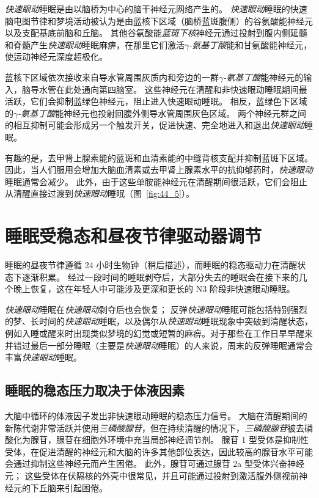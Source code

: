 \textit{快速眼动}睡眠是由以脑桥为中心的脑干神经元网络产生的。
\textit{快速眼动}睡眠的快速脑电图节律和梦境活动被认为是由蓝核下区域（脑桥蓝斑腹侧）的谷氨酸能神经元以及支配基底前脑和丘脑。
其他谷氨酸能\textit{蓝斑下核}神经元通过投射到腹内侧延髓和脊髓产生\textit{快速眼动}睡眠麻痹，在那里它们激活\textit{$\gamma$-氨基丁酸}能和甘氨酸能神经元，使运动神经元深度超极化。


蓝核下区域依次接收来自导水管周围灰质内和旁边的一群\textit{$\gamma$-氨基丁酸}能神经元的输入，脑导水管在此处通向第四脑室。
这些神经元在清醒和非快速眼动睡眠期间最活跃，它们会抑制蓝绿色神经元，阻止进入快速眼动睡眠。
相反，蓝绿色下区域的\textit{$\gamma$-氨基丁酸}能神经元也投射回腹外侧导水管周围灰色区域。
两个神经元群之间的相互抑制可能会形成另一个触发开关，促进快速、完全地进入和退出\textit{快速眼动}睡眠。


有趣的是，去甲肾上腺素能的蓝斑和血清素能的中缝背核支配并抑制蓝斑下区域。
因此，当人们服用会增加大脑血清素或去甲肾上腺素水平的抗抑郁药时，\textit{快速眼动}睡眠通常会减少。
此外，由于这些单胺能神经元在清醒期间很活跃，它们会阻止从清醒直接过渡到\textit{快速眼动}睡眠（图~\ref{fig:44_5}）。



\section{睡眠受稳态和昼夜节律驱动器调节}

睡眠的昼夜节律遵循 24 小时生物钟（稍后描述），而睡眠的稳态驱动力在清醒状态下逐渐积累。
经过一段时间的睡眠剥夺后，大部分失去的睡眠会在接下来的几个晚上恢复，这在年轻人中可能涉及更深和更长的 N3 阶段非快速眼动睡眠。


\textit{快速眼动}睡眠在\textit{快速眼动}剥夺后也会恢复；
反弹\textit{快速眼动}睡眠可能包括特别强烈的梦、长时间的\textit{快速眼动}睡眠，以及偶尔从\textit{快速眼动}睡眠现象中突破到清醒状态，例如入睡或醒来时出现类似梦境的幻觉或短暂的麻痹。对于那些在工作日早早醒来并错过最后一部分睡眠（主要是\textit{快速眼动}睡眠）的人来说，周末的反弹睡眠通常会丰富\textit{快速眼动}睡眠。



\subsection{睡眠的稳态压力取决于体液因素}

大脑中循环的体液因子发出非快速眼动睡眠的稳态压力信号。
大脑在清醒期间的新陈代谢非常活跃并使用\textit{三磷酸腺苷}，但在持续清醒的情况下，\textit{三磷酸腺苷}被去磷酸化为腺苷，腺苷在细胞外环境中充当局部神经调节剂。
腺苷 1 型受体是抑制性受体，在促进清醒的神经元和大脑的许多其他部位表达，因此较高的腺苷水平可能会通过抑制这些神经元而产生困倦。
此外，腺苷可通过腺苷 2a 型受体兴奋神经元；
这些受体在伏隔核的外壳中很常见，并且可能通过投射到激活腹外侧视前神经元的下丘脑来引起困倦。


